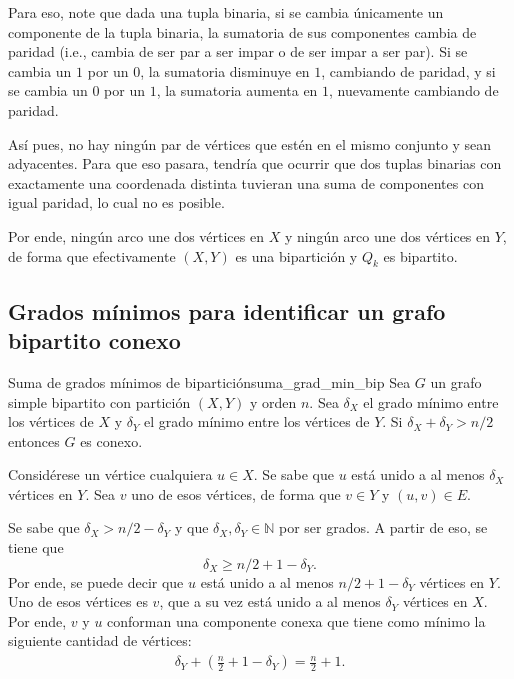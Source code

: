 Para eso, note que dada una tupla binaria, si se cambia únicamente un componente de la tupla binaria, la sumatoria de sus componentes cambia de paridad (i.e., cambia de ser par a ser impar o de ser impar a ser par). Si se cambia un \(1\) por un \(0\), la sumatoria disminuye en \(1\), cambiando de paridad, y si se cambia un \(0\) por un \(1\), la sumatoria aumenta en \(1\), nuevamente cambiando de paridad.

Así pues, no hay ningún par de vértices que estén en el mismo conjunto y sean adyacentes. Para que eso pasara, tendría que ocurrir que dos tuplas binarias con exactamente una coordenada distinta tuvieran una suma de componentes con igual paridad, lo cual no es posible.

Por ende, ningún arco une dos vértices en \(X\) y ningún arco une dos vértices en \(Y\), de forma que efectivamente \((X,Y)\) es una bipartición y \(Q_k\) es bipartito.

\subsection{Grados mínimos para identificar un grafo bipartito conexo}
\label{sec:grados_minimos_para_grafo_bipartito_conexo}

\begin{teorema}{Suma de grados mínimos de bipartición}{suma_grad_min_bip}
  Sea \(G\) un grafo simple bipartito con partición \((X, Y)\) y orden \(n\). Sea \(\delta_X\) el grado mínimo entre los vértices de \(X\) y \(\delta_Y\) el grado mínimo entre los vértices de \(Y\). Si \(\delta_X + \delta_Y > n/2\) entonces \(G\) es conexo.
\end{teorema}


Considérese un vértice cualquiera \(u \in X\). Se sabe que \(u\) está unido a al menos \(\delta_X\) vértices en \(Y\). Sea \(v\) uno de esos vértices, de forma que \(v\in Y\) y \((u,v) \in E\).

Se sabe que \(\delta_X > n/2 -\delta_Y\) y que \(\delta_X, \delta_Y \in \mathbb{N}\) por ser grados. A partir de eso, se tiene que \[
\delta_X \geq n/2+1-\delta_Y.
\]Por ende, se puede decir que \(u\) está unido a al menos \(n/2+1-\delta_Y\) vértices en \(Y\). Uno de esos vértices es \(v\), que a su vez está unido a al menos \(\delta_Y\) vértices en \(X\). Por ende, \(v\) y \(u\) conforman una componente conexa que tiene como mínimo la siguiente cantidad de vértices: \begin{gather*}
\delta_Y + \left(\frac{n}{2}+1-\delta_Y\right) = \frac{n}{2}+1.
\end{gather*}

